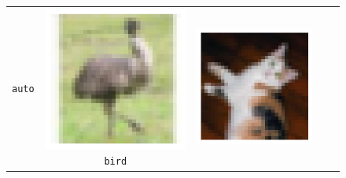 \begin{figure}[h]
\begin{tabular}{ccccc}
\begin{minipage}[b]{0.15\linewidth}
      \centering\scriptsize\texttt{auto}
    \end{minipage} &
    \begin{minipage}[b]{0.15\linewidth}
      \includegraphics[width=\linewidth]{figures/cifar-images/bird.png}
      \centering\scriptsize\texttt{bird}
    \end{minipage} &
    \begin{minipage}[b]{0.15\linewidth}
      \includegraphics[width=\linewidth]{figures/cifar-images/cat.png}

\end{minipage}
\end{tabular}
\end{figure}
